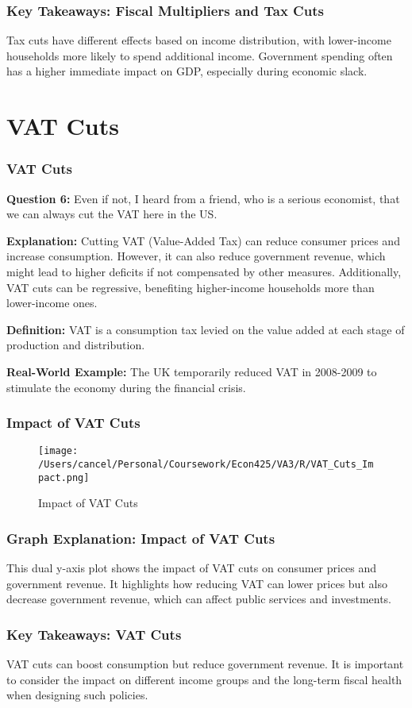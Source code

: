 \documentclass{beamer}
\begin{document}
\begin{frame}
    \frametitle{Key Takeaways: Fiscal Multipliers and Tax Cuts}
    Tax cuts have different effects based on income distribution, with lower-income households more likely to spend additional income. Government spending often has a higher immediate impact on GDP, especially during economic slack.
\end{frame}

\section{VAT Cuts}
\begin{frame}
    \frametitle{VAT Cuts}
    \textbf{Question 6:} Even if not, I heard from a friend, who is a serious economist, that we can always cut the VAT here in the US.

    \textbf{Explanation:} Cutting VAT (Value-Added Tax) can reduce consumer prices and increase consumption. However, it can also reduce government revenue, which might lead to higher deficits if not compensated by other measures. Additionally, VAT cuts can be regressive, benefiting higher-income households more than lower-income ones.

    \textbf{Definition:} VAT is a consumption tax levied on the value added at each stage of production and distribution.

    \textbf{Real-World Example:} The UK temporarily reduced VAT in 2008-2009 to stimulate the economy during the financial crisis.
\end{frame}

\begin{frame}
    \frametitle{Impact of VAT Cuts}
    \begin{figure}[h!]
        \centering
        \texttt{[image: /Users/cancel/Personal/Coursework/Econ425/VA3/R/VAT\_Cuts\_Impact.png]}
        \caption{Impact of VAT Cuts}
    \end{figure}
\end{frame}

\begin{frame}
    \frametitle{Graph Explanation: Impact of VAT Cuts}
    This dual y-axis plot shows the impact of VAT cuts on consumer prices and government revenue. It highlights how reducing VAT can lower prices but also decrease government revenue, which can affect public services and investments.
\end{frame}

\begin{frame}
    \frametitle{Key Takeaways: VAT Cuts}
    VAT cuts can boost consumption but reduce government revenue. It is important to consider the impact on different income groups and the long-term fiscal health when designing such policies.
\end{frame}
\end{document}
